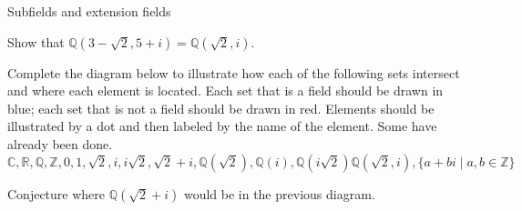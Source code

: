 \begin{section}{Subfields and extension fields}
\begin{problem}\label{prob.QAdjoinRoot27Root7}
Show that $\mathbb{Q}\left(3-\sqrt{2},5+i\right) = \mathbb{Q}\left(\sqrt{2},i\right)$.
\end{problem}

\begin{problem}\label{prob.DiagramSubfieldsRoot2andi}
Complete the diagram below to illustrate how each of the following sets intersect and where each element is located. Each set that is a field should be drawn in blue; each set that is not a field should be drawn in red. Elements should be illustrated by a dot and then labeled by the name of the element. Some have already been done.
\[\mathbb{C},\mathbb{R},\mathbb{Q}, \mathbb{Z}, 0, 1, \sqrt{2}, i, i\sqrt{2}, \sqrt{2}+i, \mathbb{Q}\left(\sqrt{2}\right), \mathbb{Q}(i), \mathbb{Q}\left(i\sqrt{2}\right) \mathbb{Q}\left(\sqrt{2},i\right), \{a+bi\mid a,b\in \mathbb{Z}\}\]
\begin{center}
\end{center}
\end{problem}

\begin{problem}
Conjecture where $\mathbb{Q}\left(\sqrt{2}+i\right)$ would be in the previous diagram.
\end{problem}


\end{section}
